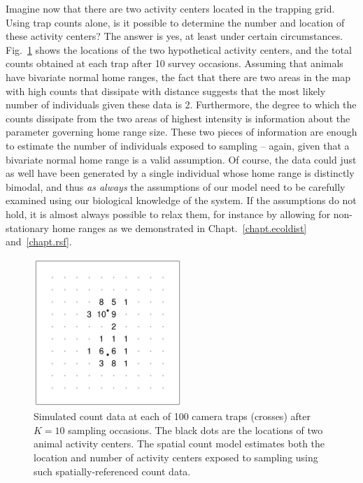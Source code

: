 Imagine now that there are two activity centers located in the trapping
grid. Using trap counts alone, %
is it possible to determine the number and location of these activity
centers? The answer is yes, at least under certain circumstances.
Fig.~\ref{chapt-unmarked.fig.heur}
shows the locations of the two hypothetical activity centers, and the total
counts obtained at each trap after 10 survey occasions.
Assuming that animals have bivariate normal home
ranges, the fact that there are two areas in the map with high counts
that dissipate with distance suggests that the most likely number of
individuals given these data is 2. Furthermore, the degree to which
the counts dissipate from the two areas of highest intensity is
information about the parameter governing home range size. These two
pieces of information are enough to estimate the number of
individuals exposed to sampling -- again, given
that a bivariate normal home range is a valid assumption. Of course,
the data could just as well have been generated by a single individual
whose home range is distinctly bimodal, and thus \textit{as always}
the assumptions of our model need to be carefully examined using our
biological knowledge of the system. If the assumptions
do not hold, it is almost always possible to relax them, for instance
by allowing for non-stationary home ranges as we demonstrated in
Chapt.~\ref{chapt.ecoldist} and~\ref{chapt.rsf}.

\begin{figure}%
\centering
\includegraphics[width=0.5\textwidth]{Ch18-Unmarked/figs/heuristic}
\caption{Simulated count data at each of 100 camera traps
  (crosses) after $K=10$ sampling occasions. The black dots are the
  locations of two animal activity centers. The
  spatial count model estimates %
  both the location and number of activity centers exposed to
  sampling using such spatially-referenced count data.}
\label{chapt-unmarked.fig.heur}
\end{figure}




